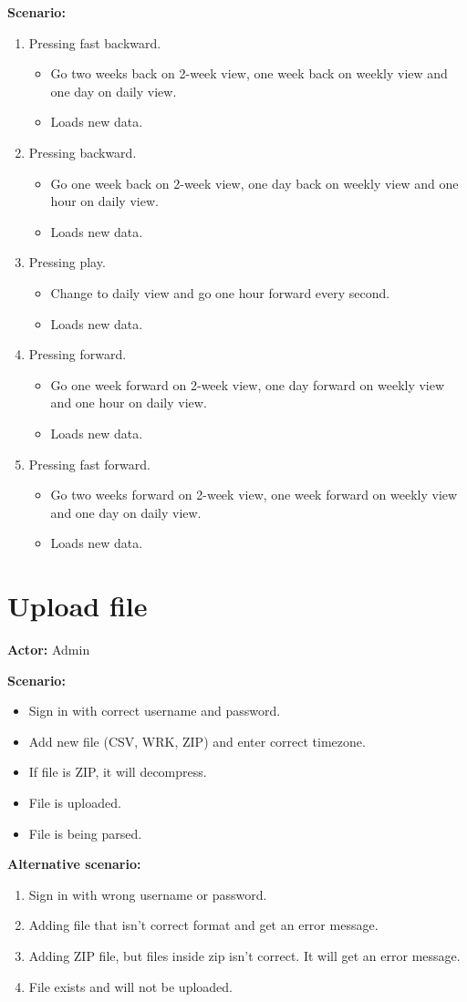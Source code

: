 \textbf{Scenario:}
\begin{enumerate}
\item Pressing fast backward.
\begin{itemize}
\item Go two weeks back on 2-week view, one week back on weekly view and one day on daily view.
\item Loads new data.
\end{itemize}
\item Pressing backward.
\begin{itemize}
\item Go one week back on 2-week view, one day back on weekly view and one hour on daily view.
\item Loads new data.
\end{itemize}
\item Pressing play.
\begin{itemize}
\item Change to daily view and go one hour forward every second.
\item Loads new data.
\end{itemize}
\item Pressing forward.
\begin{itemize}
\item Go one week forward on 2-week view, one day forward on weekly view and one hour on daily view.
\item Loads new data.
\end{itemize}
\item Pressing fast forward.
\begin{itemize}
\item Go two weeks forward on 2-week view, one week forward on weekly view and one day on daily view.
\item Loads new data.
\end{itemize}
\end{enumerate}

\section{Upload file}
\textbf{Actor:} Admin

\textbf{Scenario:}
\begin{itemize}
\item Sign in with correct username and password.
\item Add new file (CSV, WRK, ZIP) and enter correct timezone.
\item If file is ZIP, it will decompress.
\item File is uploaded.
\item File is being parsed.
\end{itemize}
\textbf{Alternative scenario:} 
\begin{enumerate}
\item Sign in with wrong username or password.
\item Adding file that isn't correct format and get an error message.
\item Adding ZIP file, but files inside zip isn't correct. It will get an error message.
\item File exists and will not be uploaded.
\end{enumerate}